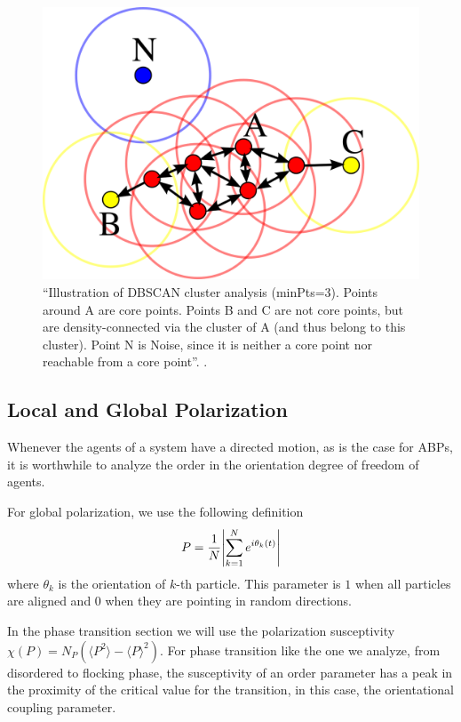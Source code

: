 \documentclass[../../master_thesis_np.tex]{subfiles}
\begin{document}
		\begin{figure}[htp]
			\centering
			\includegraphics[width=.75\textwidth]{dbscan.png}
			\caption{\enquote{Illustration of DBSCAN cluster analysis (minPts=3). Points around A are core points. Points B and C are not core points, but are density-connected via the cluster of A (and thus belong to this cluster). Point N is Noise, since it is neither a core point nor reachable from a core point}. \cite{chire_deutsch_2011}.}
			\label{fig:dbscan}
		\end{figure}
		
		\subsection{Local and Global Polarization}
		Whenever the agents of a system have a directed motion, as is the case for ABPs, it is worthwhile to analyze the order in the orientation degree of freedom of agents.  
		
		For global polarization, we use the following definition \cite{caprini_spontaneous_2020}
		\begin{equation}
			P = \frac{1}{N} \abs{\sum_{k=1}^{N} e^{i \theta_k(t)}} 
		\end{equation}
		where $\theta_k$ is the orientation of $k$-th particle. 
		This parameter is $1$ when all particles are aligned and $0$ when they are pointing in random directions. 
		
		In the phase transition section we will use the polarization susceptivity $\chi(P) = N_P(\langle P^2 \rangle - \langle P \rangle^2)$.
		For phase transition like the one we analyze, from disordered to flocking phase, the susceptivity of an order parameter has a peak in the proximity of the critical value for the transition, in this case, the orientational coupling parameter.
\end{document}
